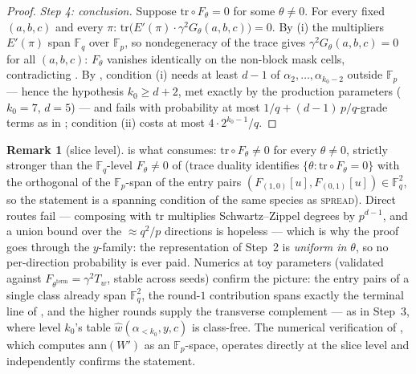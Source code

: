 \documentclass{article}
\newcommand{\Fp}{\mathbb{F}_p}
\newcommand{\Fq}{\mathbb{F}_q}
\newcommand{\extdeg}{d}
\theoremstyle{definition}
\newtheorem{remark}[theorem]{Remark}
\begin{document}
\begin{proof}
\emph{Step 4: conclusion.} Suppose $\mathrm{tr} \circ F_\theta = 0$ for some $\theta \neq 0$. For every fixed $(a, b, c)$ and every $\pi$: $\mathrm{tr}\big(E'(\pi) \cdot \gamma^2 G_\theta(a, b, c)\big) = 0$. By (i) the multipliers $E'(\pi)$ span $\Fq$ over $\Fp$, so nondegeneracy of the trace gives $\gamma^2 G_\theta(a, b, c) = 0$ for all $(a, b, c)$: $F_\theta$ vanishes identically on the non-block mask cells, contradicting . By , condition (i) needs at least $\extdeg - 1$ of $\alpha_2, \dots, \alpha_{k_0-2}$ outside $\Fp$ --- hence the hypothesis $k_0 \geq \extdeg + 2$, met exactly by the production parameters ($k_0 = 7$, $\extdeg = 5$) --- and fails with probability at most $1/q + (\extdeg - 1)\, p/q$-grade terms as in ; condition (ii) costs at most $4 \cdot 2^{k_0 - 1}/q$.
\end{proof}

\begin{remark}[slice level]\label{rem:slice}
 is what  consumes: $\mathrm{tr} \circ F_\theta \neq 0$ for every $\theta \neq 0$, strictly stronger than the $\Fq$-level $F_\theta \neq 0$ of  (trace duality identifies $\{\theta : \mathrm{tr} \circ F_\theta = 0\}$ with the orthogonal of the $\Fp$-span of the entry pairs $(F_{(1,0)}[u], F_{(0,1)}[u]) \in \Fq^2$, so the statement is a spanning condition of the same species as \textsc{spread}). Direct routes fail --- composing with $\mathrm{tr}$ multiplies Schwartz--Zippel degrees by $p^{\extdeg-1}$, and a union bound over the $\approx q^2/p$ directions is hopeless --- which is why the proof goes through the $y$-family: the representation of Step~2 is \emph{uniform in $\theta$}, so no per-direction probability is ever paid. Numerics at toy parameters (validated against $F_{\theta^{\mathrm{term}}} = \gamma^2 T_{\hat{w}}$, stable across seeds) confirm the picture: the entry pairs of a single class already span $\Fq^2$, the round-$1$ contribution spans exactly the terminal line of , and the higher rounds supply the transverse complement --- as in Step~3, where level $k_0$'s table $\hat{w}(\alpha_{<k_0}, y, c)$ is class-free. The numerical verification of , which computes $\mathrm{ann}(W')$ as an $\Fp$-space, operates directly at the slice level and independently confirms the statement.
\end{remark}
\end{document}
